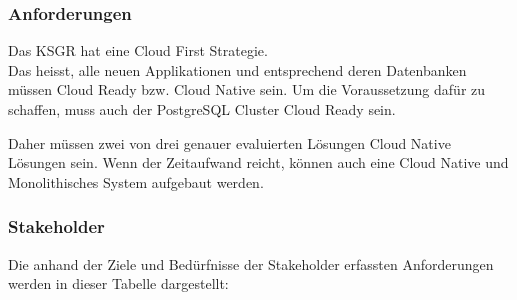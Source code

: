 
\subsubsection{Anforderungen}
\begin{flushleft}
    Das KSGR hat eine Cloud First Strategie.\\
    Das heisst, alle neuen Applikationen und entsprechend deren Datenbanken müssen Cloud Ready bzw.
    Cloud Native sein.
    Um die Voraussetzung dafür zu schaffen, muss auch der PostgreSQL Cluster Cloud Ready sein.
\end{flushleft}
\begin{flushleft}
    Daher müssen zwei von drei genauer evaluierten Lösungen Cloud Native Lösungen sein.
    Wenn der Zeitaufwand reicht, können auch eine Cloud Native und Monolithisches System aufgebaut werden.
\end{flushleft}
\begin{flushleft}
    \subsubsection{Stakeholder}
    
\end{flushleft}
\begin{flushleft}
    \clearpage
    \recalctypearea
    Die anhand der Ziele und Bedürfnisse der Stakeholder erfassten Anforderungen werden in dieser Tabelle dargestellt:
    
    \clearpage
    \recalctypearea
\end{flushleft}
